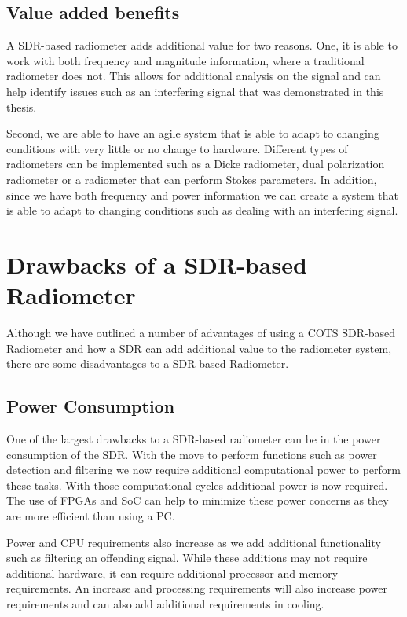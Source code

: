 {\subsection{Value added benefits}

A SDR-based radiometer adds additional value for two reasons.  One, it is able to work with both frequency and magnitude information, where a traditional radiometer does not.  This allows for additional analysis on the signal and can help identify issues such as an interfering signal that was demonstrated in this thesis.  

Second, we are able to have an agile system that is able to adapt to changing conditions with very little or no change to hardware.  Different types of radiometers can be implemented such as a Dicke radiometer, dual polarization radiometer or a radiometer that can perform Stokes parameters.  In addition, since we have both frequency and power information we can create a system that is able to adapt to changing conditions such as dealing with an interfering signal.  

\section{Drawbacks of a SDR-based Radiometer}
Although we have outlined a number of advantages of using a COTS SDR-based Radiometer and how a SDR can add additional value to the radiometer system, there are some disadvantages to a SDR-based Radiometer.

\subsection{Power Consumption}
One of the largest drawbacks to a SDR-based radiometer can be in the power consumption of the SDR.  With the move to perform functions such as power detection and filtering we now require additional computational power to perform these tasks.  With those computational cycles additional power is now required.  The use of FPGAs and SoC can help to minimize these power concerns as they are more efficient than using a PC.  

Power and CPU requirements also increase as we add additional functionality such as filtering an offending signal.  While these additions may not require additional hardware, it can require additional processor and memory requirements.  An increase and processing requirements will also increase power requirements and can also add additional requirements in cooling.

}

